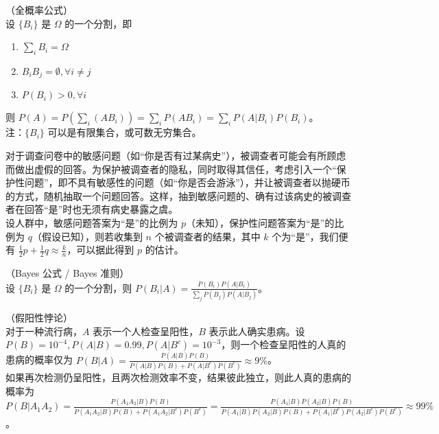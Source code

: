 \documentclass[../main.tex]{subfiles}
\begin{document}
\begin{theorem}\label{thm:1.8.1}
（全概率公式）\\
设 $\{B_i\}$ 是 $\Omega$ 的一个分割，即
\begin{enumerate}
    \item $\sum_iB_i=\Omega$
    \item $B_iB_j=\emptyset,\forall i\neq j$
    \item $P(B_i)>0,\forall i$
\end{enumerate}
则 $P(A)=P(\sum_{i}(AB_i))=\sum_iP(AB_i)=\sum_iP(A|B_i)P(B_i)$。\\
注：$\{B_i\}$ 可以是有限集合，或可数无穷集合。
\end{theorem}

\begin{example}
对于调查问卷中的敏感问题（如“你是否有过某病史”），被调查者可能会有所顾虑而做出虚假的回答。为保护被调查者的隐私，同时取得其信任，考虑引入一个“保护性问题”，即不具有敏感性的问题（如“你是否会游泳”），并让被调查者以抛硬币的方式，随机抽取一个问题回答。这样，抽到敏感问题的、确有过该病史的被调查者在回答“是”时也无须有病史暴露之虞。\\
设人群中，敏感问题答案为“是”的比例为 $p$（未知），保护性问题答案为“是”的比例为 $q$（假设已知），则若收集到 $n$ 个被调查者的结果，其中 $k$ 个为“是”，我们便有 $\frac{1}{2}p+\frac{1}{2}q\approx \frac{k}{n}$，可以据此得到 $p$ 的估计。
\end{example}

\begin{theorem}\label{thm:1.8.2}
（Bayes 公式 / Bayes 准则）\\
设 $\{B_i\}$ 是 $\Omega$ 的一个分割，则 $P(B_i|A)=\frac{P(B_i)P(A|B_i)}{\sum_j P(B_j)P(A|B_j)}$。
\end{theorem}

\begin{example}
（假阳性悖论）\\
对于一种流行病，$A$ 表示一个人检查呈阳性，$B$ 表示此人确实患病。设 $P(B)=10^{-4},P(A|B)=0.99,P(A|B^c)=10^{-3}$，则一个检查呈阳性的人真的患病的概率仅为 $P(B|A)=\frac{P(A|B)P(B)}{P(A|B)P(B)+P(A|B^c)P(B^c)}\approx 9\%$。\\
如果再次检测仍呈阳性，且两次检测效率不变，结果彼此独立，则此人真的患病的概率为 $P(B|A_1A_2)=\frac{P(A_1A_2|B)P(B)}{P(A_1A_2|B)P(B)+P(A_1A_2|B^c)P(B^c)}=\frac{P(A_1|B)P(A_2|B)P(B)}{P(A_1|B)P(A_2|B)P(B)+P(A_1|B^c)P(A_2|B^c)P(B^c)}\approx 99\%$。
\end{example}
\end{document}
